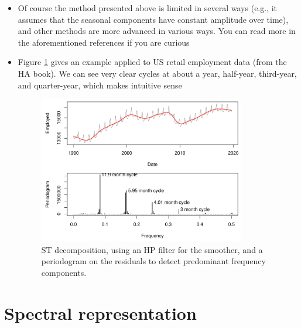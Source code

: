 \documentclass{article}
\begin{document}
\begin{itemize}
\item Of course the method presented above is limited in several ways (e.g., it
  assumes that the seasonal components have constant amplitude over time), and
  other methods are more advanced in various ways. You can read more in the 
  aforementioned references if you are curious

\item Figure \ref{fig:st_decomposition} gives an example applied to US retail 
  employment data (from the HA book). We can see very clear cycles at about a
  year, half-year, third-year, and quarter-year, which makes intuitive sense 

\begin{figure}[htb]
\centering
\includegraphics[width=0.85\textwidth]{fig/st-decomposition-1.pdf}
\caption{ST decomposition, using an HP filter for the smoother, and a
  periodogram on the residuals to detect predominant frequency components.}  
\label{fig:st_decomposition}
\end{figure}
\end{itemize}

\section{Spectral representation}
\end{document}
